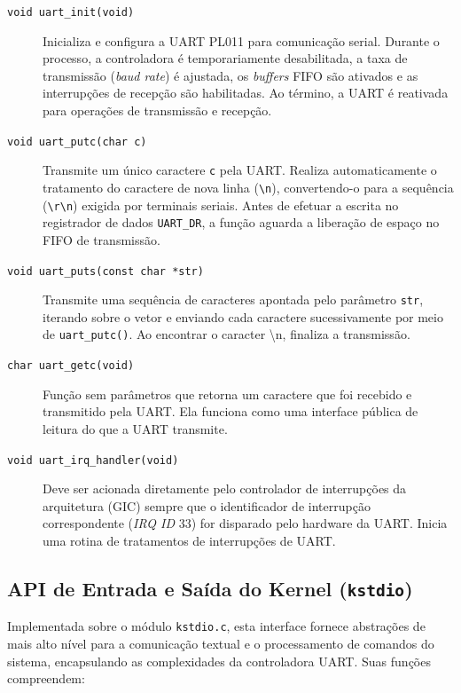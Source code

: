 \begin{description}
    \item[\texttt{void uart\_init(void)}]
    Inicializa e configura a UART PL011 para comunicação serial. Durante o processo, a controladora é temporariamente desabilitada, a taxa de transmissão (\textit{baud rate}) é ajustada, os \textit{buffers} FIFO são ativados e as interrupções de recepção são habilitadas. Ao término, a UART é reativada para operações de transmissão e recepção.

    \item[\texttt{void uart\_putc(char c)}]
    Transmite um único caractere \texttt{c} pela UART. Realiza automaticamente o tratamento do caractere de nova linha (\texttt{\textbackslash n}), convertendo-o para a sequência (\texttt{\textbackslash r\textbackslash n}) exigida por terminais seriais. Antes de efetuar a escrita no registrador de dados \texttt{UART\_DR}, a função aguarda a liberação de espaço no FIFO de transmissão.

    \item[\texttt{void uart\_puts(const char *str)}]
    Transmite uma sequência de caracteres apontada pelo parâmetro \texttt{str}, iterando sobre o vetor e enviando cada caractere sucessivamente por meio de \texttt{uart\_putc()}. Ao encontrar o caracter \textbackslash n, finaliza a transmissão.

    \item[\texttt{char uart\_getc(void)}]
    Função sem parâmetros que retorna um caractere que foi recebido e transmitido pela UART. Ela funciona como uma interface pública de leitura do que a UART transmite.

    \item[\texttt{void uart\_irq\_handler(void)}]
    Deve ser acionada diretamente pelo controlador de interrupções da arquitetura (GIC) sempre que o identificador de interrupção correspondente (\textit{IRQ ID} 33) for disparado pelo hardware da UART. Inicia uma rotina de tratamentos de interrupções de UART.
\end{description}

\subsection{API de Entrada e Saída do Kernel (\texttt{kstdio})}

Implementada sobre o módulo \texttt{kstdio.c}, esta interface fornece abstrações de mais alto nível para a comunicação textual e o processamento de comandos do sistema, encapsulando as complexidades da controladora UART. Suas funções compreendem:

